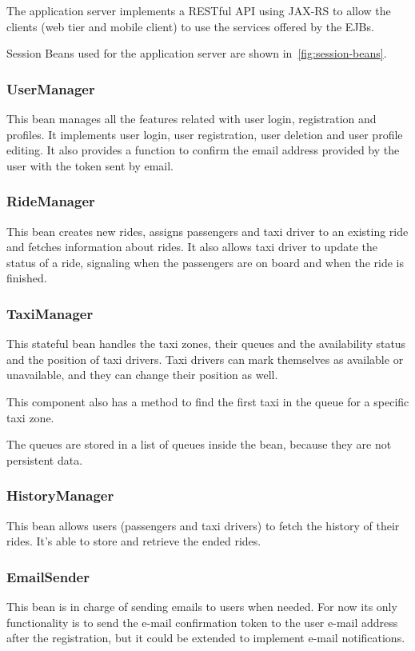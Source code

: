 The application server implements a RESTful API using JAX-RS to allow the clients (web tier and mobile client) to use the services offered by the EJBs.

Session Beans used for the application server are shown in~\autoref{fig:session-beans}.

\subsubsection{UserManager}
This bean manages all the features related with user login, registration and profiles.
It implements user login, user registration, user deletion and user profile editing.
It also provides a function to confirm the email address provided by the user with the token sent by email.

\subsubsection{RideManager}
This bean creates new rides, assigns passengers and taxi driver to an existing ride and fetches information about rides.
It also allows taxi driver to update the status of a ride, signaling when the passengers are on board and when the ride is finished.

\subsubsection{TaxiManager}
This stateful bean handles the taxi zones, their queues and the availability status and the position of taxi drivers.
Taxi drivers can mark themselves as available or unavailable, and they can change their position as well.

This component also has a method to find the first taxi in the queue for a specific taxi zone.

The queues are stored in a list of queues inside the bean, because they are not persistent data.

\subsubsection{HistoryManager}
This bean allows users (passengers and taxi drivers) to fetch the history of their rides.
It's able to store and retrieve the ended rides.

\subsubsection{EmailSender}
This bean is in charge of sending emails to users when needed. For now its only functionality is to send the e-mail confirmation token to the user e-mail address after the registration, but it could be extended to implement e-mail notifications.

